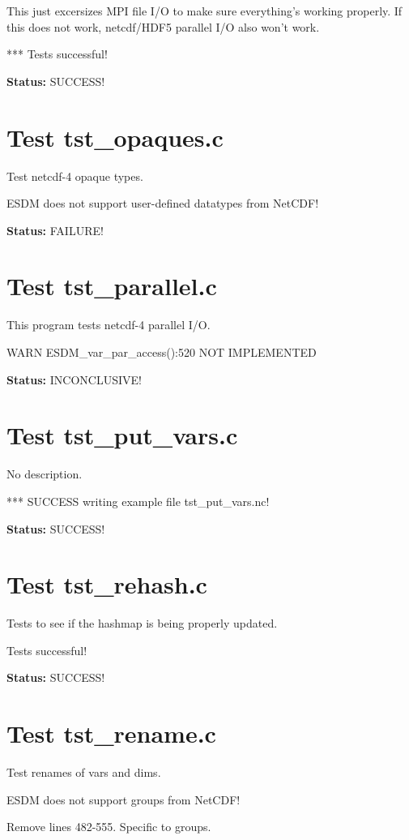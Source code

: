 This just excersizes MPI file I/O to make sure everything's working properly. If this does not work, netcdf/HDF5 parallel I/O also won't work.

*** Tests successful!

{\bf \large Status: } SUCCESS!

\section{Test tst\_opaques.c}

Test netcdf-4 opaque types.

ESDM does not support user-defined datatypes from NetCDF!

{\bf \large Status: } FAILURE!

\section{Test tst\_parallel.c}

This program tests netcdf-4 parallel I/O.

WARN ESDM\_var\_par\_access():520 NOT IMPLEMENTED

{\bf \large Status: } INCONCLUSIVE!

\section{Test tst\_put\_vars.c}

No description.

*** SUCCESS writing example file tst\_put\_vars.nc!

{\bf \large Status: } SUCCESS!

\section{Test tst\_rehash.c}

Tests to see if the hashmap is being properly updated.

Tests successful!

{\bf \large Status: } SUCCESS!

\section{Test tst\_rename.c}

Test renames of vars and dims.

ESDM does not support groups from NetCDF!

Remove lines 482-555. Specific to groups.

